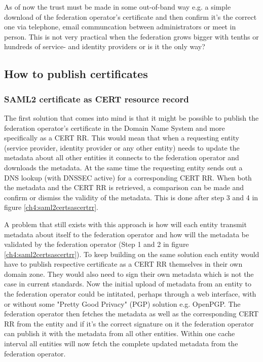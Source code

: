 As of now the trust must be made in some out-of-band way e.g. a simple download of the federation operator's certificate and then confirm it's the correct one via telephone, email communcation between administrators or meet in person.
This is not very practical when the federation grows bigger with tenths or hundreds of service- and identity providers or is it the only way?
\subsection{How to publish certificates}
\subsubsection{SAML2 certificate as CERT resource record}
\label{subsec:saml2-certificate-as-tlsa}
The first solution that comes into mind is that it might be possible to publish the federation operator's certificate in the Domain Name System and more specifically as a CERT RR\cite{rfc:4398}.
This would mean that when a requesting entity (service provider, identity provider or any other entity) needs to update the metadata about all other entities it connects to the federation operator and downloads the metadata.
At the same time the requesting entity sends out a DNS lookup (with DNSSEC active) for a corresponding CERT RR.
When both the metadata and the CERT RR is retrieved, a comparison can be made and confirm or dismiss the validity of the metadata.
This is done after step 3 and 4 in figure \ref{ch4:saml2certsascertrr}.

A problem that still exists with this approach is how will each entity transmit metadata about itself to the federation operator and how will the metadata be validated by the federation operator (Step 1 and 2 in figure \ref{ch4:saml2certsascertrr}).
To keep building on the same solution each entity would have to publish respective certificate as a CERT RR themselves in their own domain zone.
They would also need to sign their own metadata which is not the case in current standards. 
Now the initial upload of metadata from an entity to the federation operator could be intitated, perhaps through a web interface, with or without some "Pretty Good Privacy" (PGP) solution e.g. OpenPGP\cite{rfc:2440}.
The federation operator then fetches the metadata as well as the corresponding CERT RR from the entity and if it's the correct signature on it the federation operator can publish it with the metadata from all other entities.
Within one cache interval all entities will now fetch the complete updated metadata from the federation operator.

